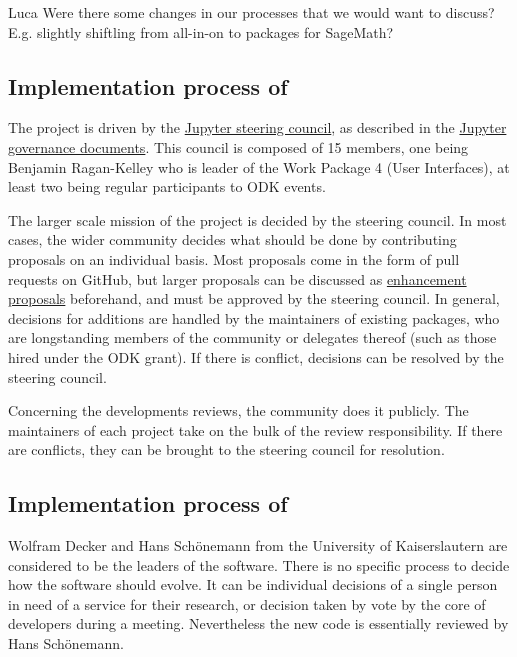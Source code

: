 \documentclass{deliverablereport}
\begin{document}
\TODO Luca
Were there some changes in our processes that we would want to discuss? E.g. slightly shiftling from all-in-on to packages for SageMath?

\subsection{Implementation process of \Jupyter}

The \Jupyter project is driven by the \href{https://jupyter.org/about.html}{Jupyter steering council}, as described in the \href{https://github.com/jupyter/governance}{Jupyter governance documents}. This council is composed of 15 members, one being Benjamin Ragan-Kelley who is leader of the Work Package 4 (User Interfaces),  at least two being regular participants to ODK events.

The larger scale mission of the project is decided by the steering council. In most cases, the wider \Jupyter community decides what should be done by contributing proposals on an individual basis. Most proposals come in the form of pull requests on GitHub, but larger proposals can be discussed as \href{https://github.com/jupyter/enhancement-proposals}{enhancement proposals} beforehand, and must be approved by the steering council. In general, decisions for additions are handled by the maintainers of existing packages, who are longstanding members of the community or delegates thereof (such as those hired under the ODK grant). If there is conflict, decisions can be resolved by the steering council.

Concerning the developments reviews, the \Jupyter community does it publicly. The maintainers of each project take on the bulk of the review responsibility. If there are conflicts, they can be brought to the steering council for resolution.


\subsection{Implementation process of \Singular}

Wolfram Decker and Hans Schönemann from the University of Kaiserslautern are considered to be the leaders of the \Singular software.
There is no specific process to decide how the software should evolve. It can be individual decisions of a single person in need of a service for their research, or decision taken by vote by the core of \Singular developers during a meeting.
Nevertheless the new code is essentially reviewed by Hans Schönemann.
\end{document}
